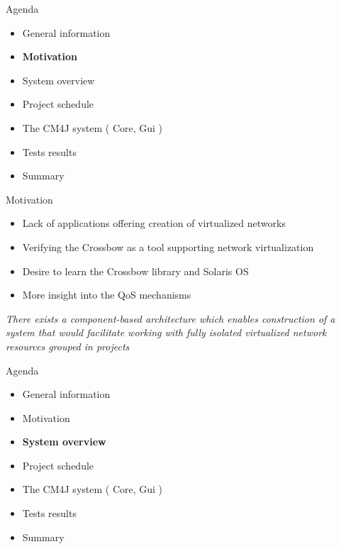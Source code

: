 \documentclass{beamer}
\begin{document}
	\begin{frame}{Agenda}

		\begin{itemize}
			\item General information
			\item \textbf{Motivation}
			\item System overview
			\item Project schedule
			\item The CM4J system ( Core, Gui )
			\item Tests results
			\item Summary
		\end{itemize}

	\end{frame}

	\begin{frame}{Motivation}
		\begin{itemize}
			\item Lack of applications offering creation of virtualized networks
			\item Verifying the Crossbow as a tool supporting network virtualization			
			\item Desire to learn the Crossbow library and Solaris OS
			\item More insight into the QoS mechanisms
		\end{itemize} \pause

		\begin{center}
			\it{There exists a component-based architecture which enables construction of a system that would facilitate working with fully isolated virtualized network resources grouped in projects}
		\end{center}
	\end{frame}

	\begin{frame}{Agenda}

		\begin{itemize}
			\item General information
			\item Motivation
			\item \textbf{System overview}
			\item Project schedule
			\item The CM4J system ( Core, Gui )
			\item Tests results
			\item Summary
		\end{itemize}

	\end{frame}
\end{document}
